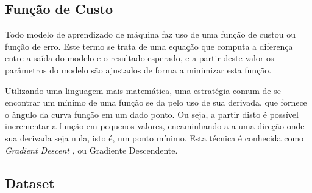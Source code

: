 

\subsection{\textbf{Função de Custo}}

Todo modelo de aprendizado de máquina faz uso de uma função de custou ou função de erro. Este termo se trata de uma equação que computa a diferença entre a saída do modelo e o resultado esperado, e a partir deste valor os parâmetros do modelo são ajustados de forma a minimizar esta função. 

Utilizando uma linguagem mais matemática, uma estratégia comum de se encontrar um mínimo de uma função se da pelo uso de sua derivada, que fornece o ângulo da curva função em um dado ponto. Ou seja, a partir disto é possível incrementar a função em pequenos valores, encaminhando-a a uma direção onde sua derivada seja nula, isto é, um ponto mínimo. Esta técnica é conhecida como \textit{Gradient Descent} \cite{cauchy}, ou Gradiente Descendente. 




\subsection{\textbf{Dataset}}
\label{dataset}

